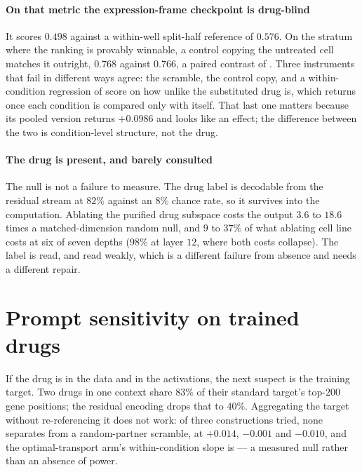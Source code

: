 \paragraph{On that metric the expression-frame checkpoint is drug-blind} It
scores $0.498$ against a within-well split-half reference of $0.576$. On the
stratum where the ranking is provably winnable, a control copying the untreated
cell matches it outright, $0.768$ against $0.766$, a paired contrast of
. Three instruments that fail in different ways agree:
the scramble, the control copy, and a within-condition regression of score on how
unlike the substituted drug is, which returns  once
each condition is compared only with itself. That last one matters because its
pooled version returns $+0.0986$ and looks like an effect; the difference between
the two is condition-level structure, not the drug.

\paragraph{The drug is present, and barely consulted} The null is not a failure
to measure. The drug label is decodable from the residual stream at $82\%$
against an $8\%$ chance rate, so it survives into the computation. Ablating the
purified drug subspace costs the output $3.6$ to $18.6$ times a matched-dimension random null, and $9$ to $37\%$ of what ablating cell line costs at six of seven depths ($98\%$ at layer $12$, where both costs collapse). The label is
read, and read weakly, which is a different failure from absence and needs a
different repair.

\section{Prompt sensitivity on trained drugs}

If the drug is in the data and in the activations, the next suspect is the
training target. Two drugs in one context share $83\%$ of their standard target's top-$200$ gene positions; the residual encoding drops that to $40\%$. Aggregating the
target without re-referencing it does not work: of three constructions tried,
none separates from a random-partner scramble, at $+0.014$, $-0.001$ and
$-0.010$, and the optimal-transport arm's within-condition slope is
 --- a measured null rather than an absence of
power.


